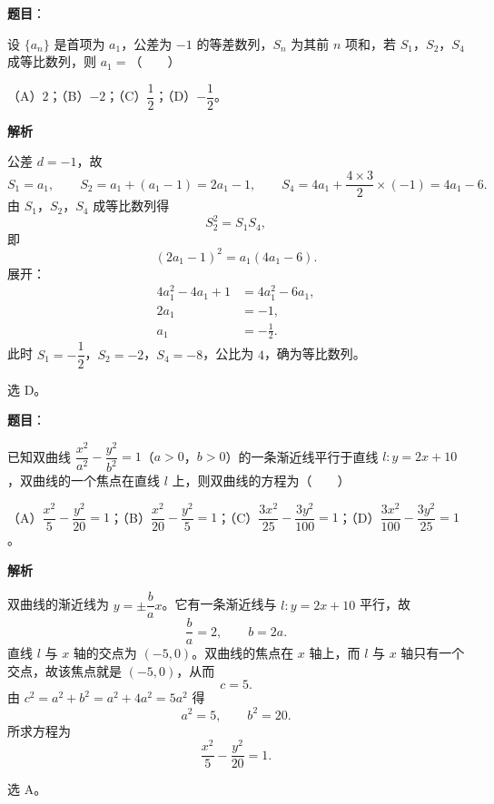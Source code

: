 \begin{answer}

\textbf{题目}：

设 $\{a_n\}$ 是首项为 $a_1$，公差为 $-1$ 的等差数列，$S_n$ 为其前 $n$ 项和，若 $S_1$，$S_2$，$S_4$ 成等比数列，则 $a_1=$\mbox{（　　）}

（A）$2$；（B）$-2$；（C）$\dfrac12$；（D）$-\dfrac12$。

\textbf{解析}

公差 $d=-1$，故
\nopagebreak[4]
\[S_1=a_1,\qquad S_2=a_1+(a_1-1)=2a_1-1,\qquad S_4=4a_1+\frac{4\times3}{2}\times(-1)=4a_1-6.\]
由 $S_1$，$S_2$，$S_4$ 成等比数列得
\nopagebreak[4]
\[S_2^2=S_1S_4,\]
即
\nopagebreak[4]
\[(2a_1-1)^2=a_1(4a_1-6).\]
展开：
\nopagebreak[4]
\[\begin{aligned}
4a_1^2-4a_1+1&=4a_1^2-6a_1,\\
2a_1&=-1,\\
a_1&=-\frac12.
\end{aligned}\]
此时 $S_1=-\dfrac12$，$S_2=-2$，$S_4=-8$，公比为 $4$，确为等比数列。

选 D。


\end{answer}
\begin{answer}

\textbf{题目}：

已知双曲线 $\dfrac{x^2}{a^2}-\dfrac{y^2}{b^2}=1$（$a>0$，$b>0$）的一条渐近线平行于直线 $l:y=2x+10$，双曲线的一个焦点在直线 $l$ 上，则双曲线的方程为\mbox{（　　）}

（A）$\dfrac{x^2}{5}-\dfrac{y^2}{20}=1$；（B）$\dfrac{x^2}{20}-\dfrac{y^2}{5}=1$；（C）$\dfrac{3x^2}{25}-\dfrac{3y^2}{100}=1$；（D）$\dfrac{3x^2}{100}-\dfrac{3y^2}{25}=1$。

\textbf{解析}

双曲线的渐近线为 $y=\pm\dfrac ba x$。它有一条渐近线与 $l:y=2x+10$ 平行，故
\nopagebreak[4]
\[\frac ba=2,\qquad b=2a.\]
直线 $l$ 与 $x$ 轴的交点为 $(-5,0)$。双曲线的焦点在 $x$ 轴上，而 $l$ 与 $x$ 轴只有一个交点，故该焦点就是 $(-5,0)$，从而
\nopagebreak[4]
\[c=5.\]
由 $c^2=a^2+b^2=a^2+4a^2=5a^2$ 得
\nopagebreak[4]
\[a^2=5,\qquad b^2=20.\]
所求方程为
\nopagebreak[4]
\[\frac{x^2}{5}-\frac{y^2}{20}=1.\]

选 A。


\end{answer}
